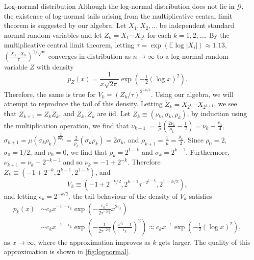 \documentclass[../thesis.tex]{subfiles}
\begin{document}
\begin{example}{Log-normal distribution}
  Although the log-normal distribution does not lie in $\mathcal{G}$, the existence of log-normal tails arising from the multiplicative central limit theorem is suggested by our algebra. Let $X_1,X_2,\dots$ be independent standard normal random variables and let $Z_k = X_1\cdots X_{2^k}$ for each $k=1,2,\dots$. By the multiplicative central limit theorem, letting $\tau = \exp(\mathbb{E}\log |X_i|) \approx 1.13$, $\left(\frac{X_{1}\cdots X_{n}}{\tau}\right)^{1/\sqrt{n}}$ converges in distribution as $n\to\infty$ to a log-normal random variable $Z$ with density
  \[
    p_Z(x) = \frac{1}{x\sqrt{2\pi}} \exp(-\tfrac12 (\log x)^2).
  \]
  Therefore, the same is true for $V_k = (Z_k / \tau)^{2^{-k/2}}$. Using our algebra, we will attempt to reproduce the tail of this density. Letting $\tilde{Z}_k = X_{2^k} \cdots X_{2^{k+1}}$, we see that $Z_{k+1} = Z_k \tilde{Z}_k$, and $Z_k,\tilde{Z}_k$ are iid. Let $Z_k \equiv (\nu_k, \sigma_k, \rho_k)$, by induction using the multiplication operation, we find that $\nu_{k+1} ~=~\frac{1}{\mu}\left(\frac{2\nu_{k}}{\rho_{k}}-\frac{1}{2}\right)=\nu_{k}-\frac{\rho_{k}}{4}$, $\sigma_{k+1}=\mu\left(\sigma_{k}\rho_{k}\right)^{\frac{2}{\mu\rho_{k}}}=\frac{2}{\rho_{k}}\left(\sigma_{k}\rho_{k}\right)=2\sigma_{k}$, and $\rho_{k+1}=\frac{1}{\mu}=\frac{\rho_{k}}{2}$.
  Since $\rho_0 = 2$, $\sigma_0 = 1/2$, and $\nu_0 = 0$, we find that $\rho_k = 2^{1-k}$ and $\sigma_k = 2^{k-1}$. Furthermore, $\nu_{k+1} = \nu_k - 2^{-k-1}$ and so $\nu_k = -1 + 2^{-k}$. Therefore $Z_k \equiv (-1+2^{-k},2^{k-1},2^{1-k})$, and
  \[
    V_k \equiv (-1+2^{-k/2},2^{k-1}\tau^{-2^{1-k}},2^{1-k/2}),
  \]
  and letting $\epsilon_k = 2^{-k/2}$, the tail behaviour of the density of $V_k$ satisfies
  \begin{align*}
    p_k(x) & \sim c_k x^{-1+\epsilon_{k}}\exp\left(-\frac{\epsilon_{k}^{-2}}{2\tau^{-2\epsilon_{k}^{2}}}x^{2\epsilon_k}\right) \\& \sim c_k x^{-1+\epsilon_{k}}\exp\left(-\frac{1}{2\tau^{-2\epsilon_{k}^{2}}}\left(\frac{x^{\epsilon_{k}}-1}{\epsilon_{k}}\right)^{2}\right) \approx c_k x^{-1}\exp\left(-\frac{1}{2}(\log x)^2\right),
  \end{align*}
  as $x \to \infty$, where the approximation improves as $k$ gets larger. The quality of this approximation is shown in \cref{fig:lognormal}.
\end{example}
\end{document}
